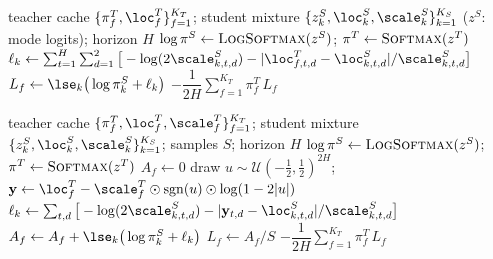 \begin{algorithm}[htbp]
\caption{Mean-target distillation loss $\mathcal{L}_{\mathrm{v1}}$ (per agent)}
\label{alg:v1}
\begin{algorithmic}[1]
\Require teacher cache $\{\pi^T_f,\loc^T_f\}_{f=1}^{K_T}$; student mixture
  $\{z^S_k,\loc^S_k,\scale^S_k\}_{k=1}^{K_S}$ ($z^S$: mode logits); horizon $H$
\State $\log\pi^S \gets \textsc{LogSoftmax}(z^S)$;\quad
       $\pi^T \gets \textsc{Softmax}(z^T)$
    \State $\ell_{k} \gets \sum_{t=1}^{H}\sum_{d=1}^{2}
            \big[-\log(2\scale^S_{k,t,d}) - |\loc^T_{f,t,d}-\loc^S_{k,t,d}|/\scale^S_{k,t,d}\big]$
  \EndFor
  \State $L_f \gets \lse_{k}\big(\log\pi^S_k + \ell_{k}\big)$
\EndFor
\State \Return $-\dfrac{1}{2H}\sum_{f=1}^{K_T}\pi^T_f\,L_f$
\end{algorithmic}
\end{algorithm}

\begin{algorithm}[htbp]
\caption{Distribution-matching distillation loss $\mathcal{L}_{\mathrm{v2}}$ (per agent)}
\label{alg:v2}
\begin{algorithmic}[1]
\Require teacher cache $\{\pi^T_f,\loc^T_f,\scale^T_f\}_{f=1}^{K_T}$; student mixture
  $\{z^S_k,\loc^S_k,\scale^S_k\}_{k=1}^{K_S}$; samples $S$; horizon $H$
\State $\log\pi^S \gets \textsc{LogSoftmax}(z^S)$;\quad
       $\pi^T \gets \textsc{Softmax}(z^T)$
  \State $A_f \gets 0$
    \State draw $u\sim\mathcal{U}(-\tfrac12,\tfrac12)^{2H}$;\quad
           $\mathbf{y} \gets \loc^T_f - \scale^T_f\odot\operatorname{sgn}(u)\odot\log(1-2|u|)$
           \label{algline:sample}
      \State $\ell_{k} \gets \sum_{t,d}
              \big[-\log(2\scale^S_{k,t,d}) - |\mathbf{y}_{t,d}-\loc^S_{k,t,d}|/\scale^S_{k,t,d}\big]$
    \EndFor
    \State $A_f \gets A_f + \lse_{k}\big(\log\pi^S_k + \ell_{k}\big)$
  \EndFor
  \State $L_f \gets A_f / S$ 
\EndFor
\State \Return $-\dfrac{1}{2H}\sum_{f=1}^{K_T}\pi^T_f\,L_f$
\end{algorithmic}
\end{algorithm}

